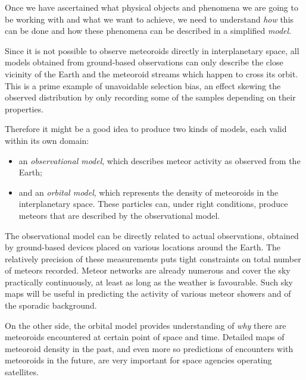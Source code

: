 
Once we have ascertained what physical objects and phenomena we are going to be working with and what we want to achieve,
we need to understand \emph{how} this can be done and how these phenomena can be described in a simplified \emph{model}.

Since it is not possible to observe meteoroids directly in interplanetary space,
all models obtained from ground-based observations can only describe the close
vicinity of the Earth and the meteoroid streams which happen to cross its orbit.
This is a prime example of unavoidable selection bias, an effect skewing the observed distribution
by only recording some of the samples depending on their properties.


Therefore it might be a good idea to produce two kinds of models, each valid within its own domain:
\begin{itemize}
    \item an \emph{observational model}, which describes meteor activity as observed from the Earth;
    \item and an \emph{orbital model}, which represents the density of meteoroids in the interplanetary space.
        These particles can, under right conditions, produce meteors that are described by the observational model.
\end{itemize}

The observational model can be directly related to actual observations, obtained by ground-based
devices placed on various locations around the Earth. The relatively precision of these measurements puts
tight constraints on total number of meteors recorded. Meteor networks are already numerous
and cover the sky practically continuously, at least as long as the weather is favourable.
Such sky maps will be useful in predicting the activity of various meteor showers and of the sporadic background.

On the other side, the orbital model provides understanding of \emph{why} there are meteoroids
encountered at certain point of space and time. Detailed maps of meteoroid density in the past,
and even more so predictions of encounters with meteoroids in the future, are very important
for space agencies operating satellites.

